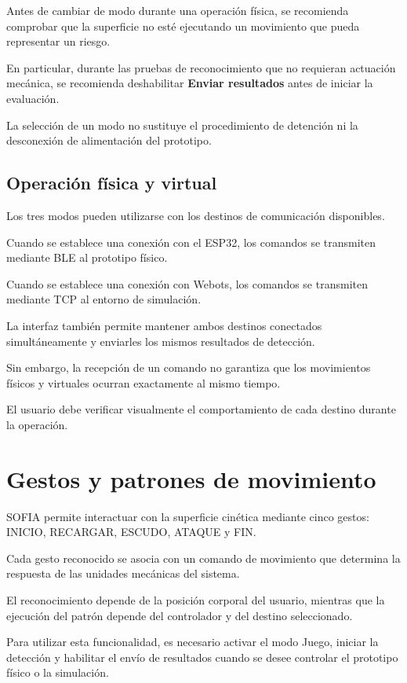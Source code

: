 \documentclass[letterpaper,journal]{IEEEtran}
\begin{document}
Antes de cambiar de modo durante una operación
física, se recomienda comprobar que la superficie
no esté ejecutando un movimiento que pueda
representar un riesgo.

En particular, durante las pruebas de reconocimiento
que no requieran actuación mecánica, se recomienda
deshabilitar \textbf{Enviar resultados} antes
de iniciar la evaluación.

La selección de un modo no sustituye el
procedimiento de detención ni la desconexión
de alimentación del prototipo.

\subsection{Operación física y virtual}

Los tres modos pueden utilizarse con los
destinos de comunicación disponibles.

Cuando se establece una conexión con el ESP32,
los comandos se transmiten mediante BLE al
prototipo físico.

Cuando se establece una conexión con Webots,
los comandos se transmiten mediante TCP al
entorno de simulación.

La interfaz también permite mantener ambos
destinos conectados simultáneamente y enviarles
los mismos resultados de detección.

Sin embargo, la recepción de un comando no
garantiza que los movimientos físicos y
virtuales ocurran exactamente al mismo tiempo.

El usuario debe verificar visualmente el
comportamiento de cada destino durante
la operación.

\section{Gestos y patrones de movimiento}
\label{sec:gestos_patrones}

SOFIA permite interactuar con la superficie
cinética mediante cinco gestos: INICIO,
RECARGAR, ESCUDO, ATAQUE y FIN.

Cada gesto reconocido se asocia con un comando
de movimiento que determina la respuesta de
las unidades mecánicas del sistema.

El reconocimiento depende de la posición
corporal del usuario, mientras que la ejecución
del patrón depende del controlador y del
destino seleccionado.

Para utilizar esta funcionalidad, es necesario
activar el modo Juego, iniciar la detección
y habilitar el envío de resultados cuando
se desee controlar el prototipo físico
o la simulación.
\end{document}
